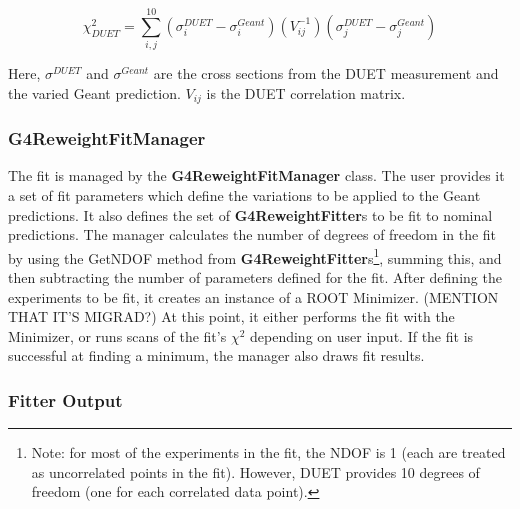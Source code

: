 \documentclass[12pt]{article}
\begin{document}
\begin{equation}
\chi^2_{DUET} = \sum\limits_{i,j}^{10}(\sigma^{DUET}_i - \sigma^{Geant}_i)(V_{ij}^{-1})(\sigma^{DUET}_j - \sigma^{Geant}_j)
\end{equation}

Here, $\sigma^{DUET}$ and $\sigma^{Geant}$ are the cross sections from the DUET measurement and the varied Geant prediction. $V_{ij}$ is the DUET correlation matrix.

\subsubsection{G4ReweightFitManager} 

The fit is managed by the \textbf{G4ReweightFitManager} class. The user provides it a set of fit parameters which define the variations to be applied to the Geant predictions. It also defines the set of \textbf{G4ReweightFitter}s to be fit to nominal predictions. The manager calculates the number of degrees of freedom in the fit by using the GetNDOF method from \textbf{G4ReweightFitter}s\footnote{Note: for most of the experiments in the fit, the NDOF is 1 (each are treated as uncorrelated points in the fit). However, DUET provides 10 degrees of freedom (one for each correlated data point).}, summing this, and then subtracting the number of parameters defined for the fit. After defining the experiments to be fit, it creates an instance of a ROOT Minimizer. (MENTION THAT IT'S MIGRAD?) At this point, it either performs the fit with the Minimizer, or runs scans of the fit's $\chi^2$ depending on user input. If the fit is successful at finding a minimum, the manager also draws fit results. 

\subsubsection{Fitter Output}
\end{document}
